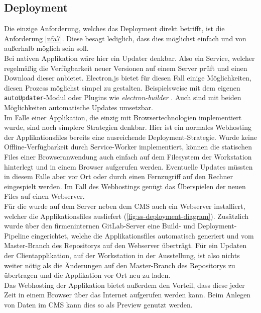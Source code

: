 \subsection{Deployment}
\label{subs:deployment}

Die einzige Anforderung, welches das Deployment direkt betrifft, ist die Anforderung
\ref{nfa7}. Diese besagt lediglich, dass dies möglichst einfach und von außerhalb möglich
sein soll.\\
Bei nativen Applikation wäre hier ein Updater denkbar. Also ein Service,
welcher regelmäßig die Verfügbarkeit neuer Versionen auf einem Server prüft und einen Download 
dieser anbietet. Electron.js bietet für diesen Fall einige Möglichkeiten, diesen Prozess 
möglichst simpel zu gestalten. Beispielsweise mit dem eigenen 
\texttt{autoUpdater}-Modul \cite{electron-autoUpdater} oder Plugins wie 
\emph{electron-builder} \cite{electron-builder}. Auch sind mit beiden Möglichkeiten
automatische Updates umsetzbar.\\
Im Falle einer Applikation, die einzig mit Browsertechnologien implementiert wurde, sind 
noch simplere Strategien denkbar. Hier ist ein normales Webhosting der Applikationsfiles 
bereits eine ausreichende Deployment-Strategie. Wurde keine Offline-Verfügbarkeit durch
Service-Worker implementiert, können die statischen Files einer Browseranwendung
auch einfach auf dem Filesystem der Workstation hinterlegt und in einem Browser aufgerufen 
werden. Eventuelle Updates müssten in diesem Falle aber vor Ort oder durch einen
Fernzugriff auf den Rechner eingespielt werden. Im Fall des Webhostings genügt das Überspielen
der neuen Files auf einen Webserver.\\

Für die \shst{} wurde auf dem Server neben dem CMS auch ein Webserver installiert, welcher die 
Applikationsfiles ausliefert (\autoref{fig:ss-deployment-diagram}). Zusätzlich wurde über den 
firmeninternen GitLab-Server \cite{gitlab} eine Build- und Deployment-Pipeline eingerichtet, welche die 
Applikationsfiles automatisch generiert und vom Master-Branch des Repositorys auf den Webserver überträgt. 
Für ein Updaten der Clientapplikation, auf der Workstation in der Ausstellung, ist also nichts weiter 
nötig als die Änderungen auf den Master-Branch des Repositorys zu übertragen und die Applikation vor
Ort neu zu laden.\\
Das Webhosting der Applikation bietet außerdem den Vorteil, dass diese jeder Zeit in einem Browser 
über das Internet aufgerufen werden kann. Beim Anlegen von Daten im CMS kann dies so als
Preview genutzt werden.
